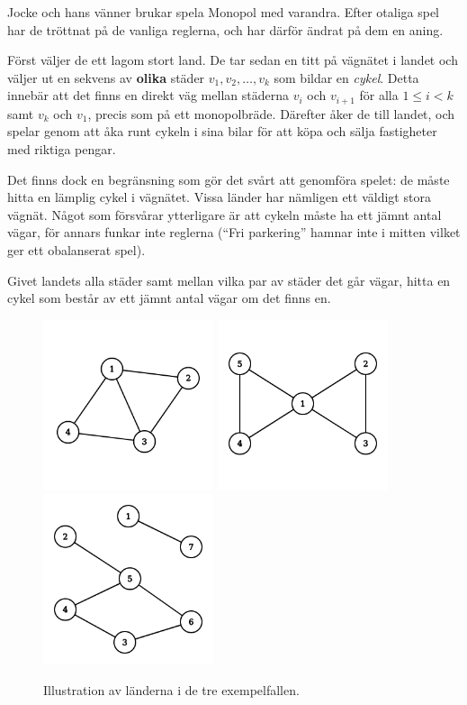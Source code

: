 Jocke och hans vänner brukar spela Monopol med varandra.
Efter otaliga spel har de tröttnat på de vanliga reglerna, och har därför ändrat på dem en aning.

Först väljer de ett lagom stort land.
De tar sedan en titt på vägnätet i landet och väljer ut en sekvens av \textbf{olika} städer $v_1, v_2, \dots, v_k$ som bildar en \emph{cykel}.
Detta innebär att det finns en direkt väg mellan städerna $v_i$ och $v_{i+1}$ för alla $1 \le i < k$ samt $v_k$ och $v_1$, precis som på ett monopolbräde.
Därefter åker de till landet, och spelar genom att åka runt cykeln i sina bilar för att köpa och sälja fastigheter med riktiga pengar.

Det finns dock en begränsning som gör det svårt att genomföra spelet: de måste hitta en lämplig cykel i vägnätet.
Vissa länder har nämligen ett väldigt stora vägnät.
Något som försvårar ytterligare är att cykeln måste ha ett jämnt antal vägar, för annars funkar inte reglerna (``Fri parkering'' hamnar inte
i mitten vilket ger ett obalanserat spel).

Givet landets alla städer samt mellan vilka par av städer det går vägar, hitta en cykel som består av ett jämnt antal vägar om det finns en.

\begin{figure}[!h]
  \centering
  \includegraphics[width=5cm]{sample1.png}
  \quad
  \includegraphics[width=5cm]{sample2.png}
  \quad
  \includegraphics[width=5cm]{sample3.png}
  \caption{Illustration av länderna i de tre exempelfallen.}
\end{figure}

